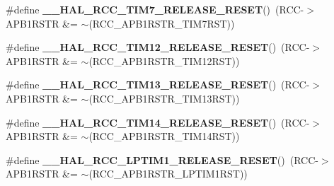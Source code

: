 \begin{DoxyCompactItemize}
\item 
\mbox{\label{group___r_c_c_ex___force___release___peripheral___reset_ga4451d9cbc82223d913fae1f6b8187996}} 
\#define {\bfseries \+\_\+\+\_\+\+H\+A\+L\+\_\+\+R\+C\+C\+\_\+\+T\+I\+M7\+\_\+\+R\+E\+L\+E\+A\+S\+E\+\_\+\+R\+E\+S\+ET}()~(R\+CC-\/$>$A\+P\+B1\+R\+S\+TR \&= $\sim$(R\+C\+C\+\_\+\+A\+P\+B1\+R\+S\+T\+R\+\_\+\+T\+I\+M7\+R\+ST))
\item 
\mbox{\label{group___r_c_c_ex___force___release___peripheral___reset_gab26147981205dd120cfc129d3031459c}} 
\#define {\bfseries \+\_\+\+\_\+\+H\+A\+L\+\_\+\+R\+C\+C\+\_\+\+T\+I\+M12\+\_\+\+R\+E\+L\+E\+A\+S\+E\+\_\+\+R\+E\+S\+ET}()~(R\+CC-\/$>$A\+P\+B1\+R\+S\+TR \&= $\sim$(R\+C\+C\+\_\+\+A\+P\+B1\+R\+S\+T\+R\+\_\+\+T\+I\+M12\+R\+ST))
\item 
\mbox{\label{group___r_c_c_ex___force___release___peripheral___reset_gad95dc322d87913d9bee93a1f41ff5403}} 
\#define {\bfseries \+\_\+\+\_\+\+H\+A\+L\+\_\+\+R\+C\+C\+\_\+\+T\+I\+M13\+\_\+\+R\+E\+L\+E\+A\+S\+E\+\_\+\+R\+E\+S\+ET}()~(R\+CC-\/$>$A\+P\+B1\+R\+S\+TR \&= $\sim$(R\+C\+C\+\_\+\+A\+P\+B1\+R\+S\+T\+R\+\_\+\+T\+I\+M13\+R\+ST))
\item 
\mbox{\label{group___r_c_c_ex___force___release___peripheral___reset_ga241bf274a6fba46a49b50aedaf1e08d3}} 
\#define {\bfseries \+\_\+\+\_\+\+H\+A\+L\+\_\+\+R\+C\+C\+\_\+\+T\+I\+M14\+\_\+\+R\+E\+L\+E\+A\+S\+E\+\_\+\+R\+E\+S\+ET}()~(R\+CC-\/$>$A\+P\+B1\+R\+S\+TR \&= $\sim$(R\+C\+C\+\_\+\+A\+P\+B1\+R\+S\+T\+R\+\_\+\+T\+I\+M14\+R\+ST))
\item 
\mbox{\label{group___r_c_c_ex___force___release___peripheral___reset_ga70b1086ae23902e74a5a2a596a848430}} 
\#define {\bfseries \+\_\+\+\_\+\+H\+A\+L\+\_\+\+R\+C\+C\+\_\+\+L\+P\+T\+I\+M1\+\_\+\+R\+E\+L\+E\+A\+S\+E\+\_\+\+R\+E\+S\+ET}()~(R\+CC-\/$>$A\+P\+B1\+R\+S\+TR \&= $\sim$(R\+C\+C\+\_\+\+A\+P\+B1\+R\+S\+T\+R\+\_\+\+L\+P\+T\+I\+M1\+R\+ST))
\item 
\mbox{\label{group___r_c_c_ex___force___release___peripheral___reset_gacb910fd0c3c5a27d020ef3df20fce4c7}} 

\end{DoxyCompactItemize}

